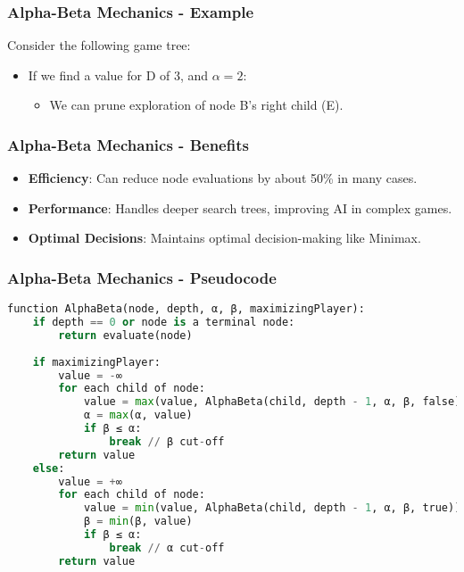 \documentclass[aspectratio=169]{beamer}
\begin{document}
\begin{frame}[fragile]
    \frametitle{Alpha-Beta Mechanics - Example}
    Consider the following game tree:

    \begin{center}
    \end{center}

    \begin{itemize}
        \item If we find a value for D of 3, and $\alpha = 2$:
            \begin{itemize}
                \item We can prune exploration of node B's right child (E).
            \end{itemize}
    \end{itemize}
\end{frame}

\begin{frame}[fragile]
    \frametitle{Alpha-Beta Mechanics - Benefits}
    \begin{itemize}
        \item \textbf{Efficiency}: Can reduce node evaluations by about 50\% in many cases.
        \item \textbf{Performance}: Handles deeper search trees, improving AI in complex games.
        \item \textbf{Optimal Decisions}: Maintains optimal decision-making like Minimax.
    \end{itemize}
\end{frame}

\begin{frame}[fragile]
    \frametitle{Alpha-Beta Mechanics - Pseudocode}
    \begin{lstlisting}[language=Python]
function AlphaBeta(node, depth, α, β, maximizingPlayer):
    if depth == 0 or node is a terminal node:
        return evaluate(node)
    
    if maximizingPlayer:
        value = -∞
        for each child of node:
            value = max(value, AlphaBeta(child, depth - 1, α, β, false))
            α = max(α, value)
            if β ≤ α:
                break // β cut-off
        return value
    else:
        value = +∞
        for each child of node:
            value = min(value, AlphaBeta(child, depth - 1, α, β, true))
            β = min(β, value)
            if β ≤ α:
                break // α cut-off
        return value
    \end{lstlisting}
\end{frame}
\end{document}
